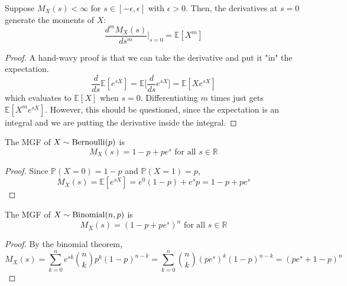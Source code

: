 	\begin{theorem}
	  \label{thm:moment-generating-property}
		Suppose $M_X (s) < \infty$ for $s \in [-\epsilon, \epsilon]$ with $\epsilon > 0$. Then, the derivatives at $s = 0$ generate the moments of $X$: 
		\begin{equation}
			\frac{d^m M_X (s)}{d s^m} \bigg|_{s = 0} = \mathbb{E}[X^m]
		\end{equation}
	\end{theorem}
	\begin{proof}
		A hand-wavy proof is that we can take the derivative and put it "in" the expectation. 
		\begin{equation}
			\frac{d}{ds} \mathbb{E}[e^{s X}] = \mathbb{E} \big[ \frac{d}{ds} e^{s X} \big] = \mathbb{E}[X e^{s X}]
		\end{equation}
		which evaluates to $\mathbb{E}[X]$ when $s = 0$. Differentiating $m$ times just gets $\mathbb{E}[X^m e^{s X}]$. However, this should be questioned, since the expectation is an integral and we are putting the derivative inside the integral. 
	\end{proof}

	\begin{theorem}
	  \label{thm:mgf-of-bernoulli-distribution}
		The MGF of \hyperref[def:indicator-bernoulli-random-variable]{$X \sim \operatorname{Bernoulli}(p)$} is 
		\begin{equation}
			M_X (s) = 1 - p + p e^s \text{ for all } s \in \mathbb{R}
		\end{equation}
	\end{theorem}
	\begin{proof}
		Since $\mathbb{P}(X = 0) = 1 - p$ and $\mathbb{P}(X = 1) = p$, 
		\begin{equation}
			M_X (s) = \mathbb{E}[e^{s X}] = e^{0} (1 - p) + e^{s} p = 1 - p + p e^s
		\end{equation}
	\end{proof}

	\begin{theorem}
	  \label{thm:mgf-of-binomial-distribution}
		The MGF of \hyperref[def:binomial-random-variable]{$X \sim \operatorname{Binomial}(n, p)$} is 
		\begin{equation}
			M_X (s) = (1 - p + p e^s)^n \text{ for all } s \in \mathbb{R}
		\end{equation}
	\end{theorem}
	\begin{proof}
		By the binomial theorem, 
		\begin{equation}
			M_X (s) = \sum_{k=0}^n e^{s k} \binom{n}{k} p^k (1 - p)^{n-k} = \sum_{k=0}^n \binom{n}{k} (p e^s)^k (1 - p)^{n-k} = (p e^s + 1 - p)^n
		\end{equation}
	\end{proof}

